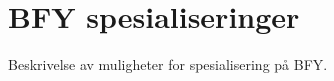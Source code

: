 \chapter{BFY spesialiseringer}
\label{c:bfy-spec}
Beskrivelse av muligheter for spesialisering på BFY.